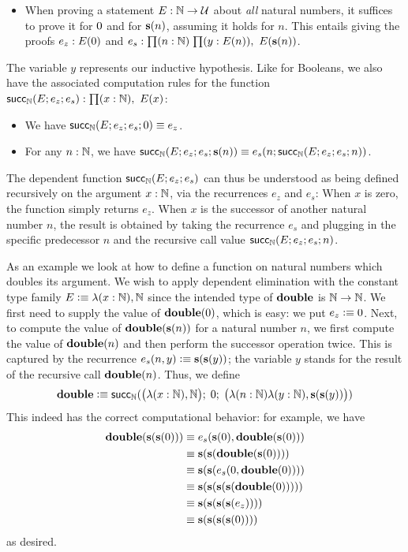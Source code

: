 \begin{itemize}
\item When proving a statement $E : \mathbb{N} \to \mathcal{U}$ about \emph{all} natural numbers, it suffices to prove it for $0$ and for $\mathbf{s}(n)$, assuming it holds
for $n$. This entails giving the proofs $e_z : E(0)$ and $e_s : \prd{n : \nat}{y : E(n)} E(\s(n))$.
\end{itemize}
The variable $y$ represents our inductive hypothesis. Like for Booleans, we also have the associated computation rules for the function $\rec_\nat(E;e_z;e_s) : \prd{x:\nat} E(x)$:
\begin{itemize}
\item We have $\mathsf{succ}_\mathbb{N}(E;e_z;e_s;0) \equiv e_z$.
\item For any $n : \mathbb{N}$, we have $\mathsf{succ}_\mathbb{N}(E;e_z;e_s;\mathbf{s}(n)) \equiv e_s(n;\mathsf{succ}_\mathbb{N}(E;e_z;e_s;n))$.
\end{itemize}
The dependent function $\mathsf{succ}_\mathbb{N}(E;e_z;e_s)$ can thus be understood as being defined recursively on the argument $x : \mathbb{N}$, via the recurrences $e_z$ and $e_s$: When $x$ is zero, the function simply returns $e_z$. When $x$ is the successor of another natural number $n$, the result is obtained by taking the recurrence $e_s$ and plugging in the specific predecessor $n$ and the recursive call value $\mathsf{succ}_\mathbb{N}(E;e_z;e_s;n)$.

As an example we look at how to define a function on natural numbers which doubles its argument. We wish to apply dependent elimination with the constant type family $E \vcentcolon\equiv \lambda(x : \mathbb{N}), \mathbb{N}$ since the intended type of $\mathbf{double}$ is $\mathbb{N} \to \mathbb{N}$. We first need to supply the value of $\mathbf{double}(0)$, which is easy: we put $e_z \vcentcolon\equiv 0$. Next, to compute the value of $\mathbf{double}(\mathbf{s}(n))$ for a natural number $n$, we first compute the value of $\mathbf{double}(n)$ and then perform the successor operation twice. This is captured by the recurrence $e_s(n,y) \vcentcolon\equiv \mathbf{s}(\mathbf{s}(y))$; the variable $y$ stands for the result of the recursive call $\mathbf{double}(n)$. Thus, we define
\[ \mathbf{double} \vcentcolon\equiv \mathsf{succ}_\mathbb{N}(\big(\lambda(x :\mathbb{N}), \mathbb{N}\big); \; 0; \;  \big(\lambda(n: \mathbb{N}) \lambda (y:\mathbb{N}), \mathbf{s}(\mathbf{s}(y))\big)) \]
This indeed has the correct computational behavior: for example, we have 
\begin{align*}
\mathbf{double}(\mathbf{s}(\mathbf{s}(0))) & \equiv e_s(\mathbf{s}(0), \mathbf{double}(\mathbf{s}(0))) \\
                 & \equiv \mathbf{s}(\mathbf{s}(\mathbf{double}(\mathbf{s}(0)))) \\
                 & \equiv \mathbf{s}(\mathbf{s}(e_s(0,\mathbf{double}(0)))) \\
                 & \equiv \mathbf{s}(\mathbf{s}(\mathbf{s}(\mathbf{s}(\mathbf{double}(0))))) \\
                 & \equiv \mathbf{s}(\mathbf{s}(\mathbf{s}(\mathbf{s}(e_z)))) \\
                 & \equiv \mathbf{s}(\mathbf{s}(\mathbf{s}(\mathbf{s}(0))))
\end{align*}
as desired.

